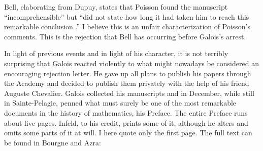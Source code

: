 \documentclass[12pt]{article}
\begin{document}
Bell, elaborating from Dupuy, states that Poisson found the manuscript ``incomprehensible'' but ``did not state how long it had taken him to reach this remarkable conclusion \cite{72}.'' I believe this is an unfair characterization of Poisson's comments. This is the rejection that Bell has occurring before Galois's arrest.

In light of previous events and in light of his character, it is not terribly surprising that Galois reacted violently to what might nowadays be considered an encouraging rejection letter. He gave up all plans to publish his papers through the Academy and decided to publish them privately with the help of his friend Auguste Chevalier. Galois collected his manuscripts and in December, while still in Sainte-Pelagie, penned what must surely be one of the most remarkable documents in the history of mathematics, his Preface. The entire Preface runs about five pages. Infeld, to his credit, prints some of it, although he alters and omits some parts of it at will. I here quote only the first page. The full text can be found in Bourgne and Azra:
\end{document}
